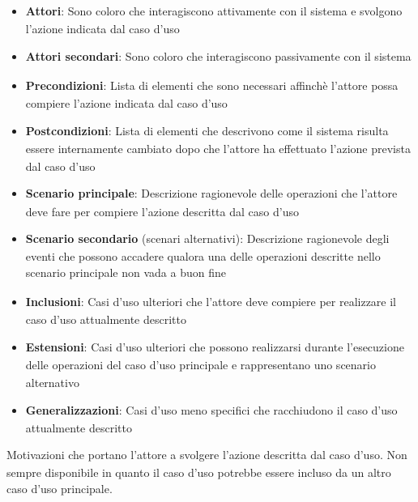 ﻿\documentclass[a4paper,11pt]{article}
\begin{document}
\begin{itemize}
    \item \textbf{Attori\textsubscript{}}: Sono coloro che interagiscono attivamente con il sistema e
    svolgono l'azione indicata dal caso d'uso
    \item \textbf{Attori\textsubscript{} secondari}: Sono coloro che interagiscono passivamente con il sistema
    \item \textbf{Precondizioni\textsubscript{}}: Lista di elementi che sono necessari affinchè l'attore\textsubscript{} possa
    compiere l'azione indicata dal caso d'uso
    \item \textbf{Postcondizioni\textsubscript{}}: Lista di elementi che descrivono come il sistema risulta
    essere internamente cambiato dopo che l'attore\textsubscript{} ha effettuato
    l'azione prevista dal caso d'uso
    \item \textbf{Scenario principale\textsubscript{}}: Descrizione ragionevole delle operazioni che l'attore\textsubscript{} deve
    fare per compiere l'azione descritta dal caso d'uso
    \item \textbf{Scenario secondario\textsubscript{}} (scenari alternativi): Descrizione ragionevole degli eventi che possono accadere
    qualora una delle operazioni descritte nello scenario
    principale\textsubscript{} non vada a buon fine
    \item \textbf{Inclusioni}: Casi d'uso\textsubscript{} ulteriori che l'attore\textsubscript{} deve compiere per realizzare
    il caso d'uso attualmente descritto
    \item \textbf{Estensioni}: Casi d'uso\textsubscript{} ulteriori che possono realizzarsi durante
    l'esecuzione delle operazioni del caso d'uso principale e rappresentano uno scenario\textsubscript{} alternativo
    \item \textbf{Generalizzazioni}: Casi d'uso\textsubscript{} meno specifici che racchiudono il caso d'uso attualmente descritto
    
\end{itemize}
Motivazioni che portano l'attore\textsubscript{} a svolgere l'azione descritta
dal caso d'uso. Non sempre disponibile in quanto il caso
d'uso potrebbe essere incluso da un altro caso d'uso principale.
\end{document}
